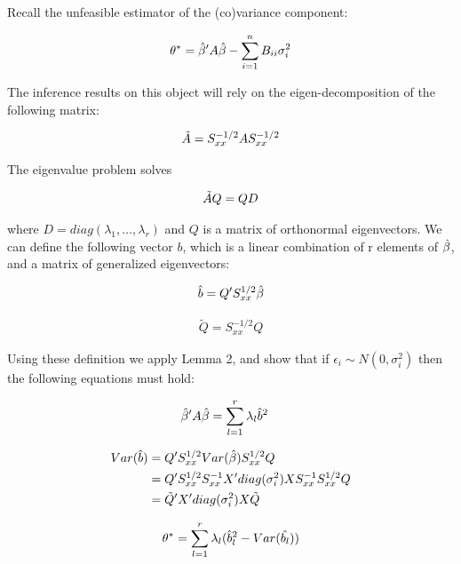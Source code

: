 \documentclass[12pt]{article}
\begin{document}
Recall the unfeasible estimator of the (co)variance component: 

\begin{align}
\theta^* = \Hat{\beta}' A \Hat{\beta} - \sum_{i=1}^n B_{ii} \sigma_i^2
\end{align}

The inference results on this object will rely on the eigen-decomposition of the following matrix:

\begin{align}
    \Tilde{A} = S_{xx}^{-1/2}  A S_{xx}^{-1/2} 
\end{align}

The eigenvalue problem solves

\begin{align}
    \Tilde{A}  Q = Q D
\end{align}

where $D=diag(\lambda_1,\dots,\lambda_r)$ and $Q$ is a matrix of orthonormal eigenvectors. We can define the following vector $b$, which is a linear combination of r elements of $\Hat{\beta}$, and a matrix of generalized eigenvectors:

\begin{align}
    \Hat{b} = Q' S_{xx}^{1/2} \Hat{\beta}
\end{align}

\begin{align}
    \tilde{Q} = S_{xx}^{-1/2} Q  
\end{align}



Using these definition we apply Lemma 2, and show that if $\epsilon_i \sim N(0,\sigma_i^2)$ then the following equations must hold: 


\begin{align}
\Hat{\beta}' A \Hat{\beta} &= \sum_{l=1}^r \lambda_l \Hat{b}^2  
\end{align}

\begin{align}
Var(\Hat{b}) &= Q' S_{xx}^{1/2} Var(\Hat{\beta}) S_{xx}^{1/2}Q \\
&= Q' S_{xx}^{1/2} S_{xx}^{-1} X' diag(\sigma_i^2) X S_{xx}^{-1}  S_{xx}^{1/2} Q \\
&= \Tilde{Q}' X' diag(\sigma_i^2) X \Tilde{Q}
\end{align}

\begin{align}
    \theta^* = \sum_{l=1}^r \lambda_l (\Hat{b}_l^2 - Var(\Hat{b_l}))
\end{align}
\end{document}
